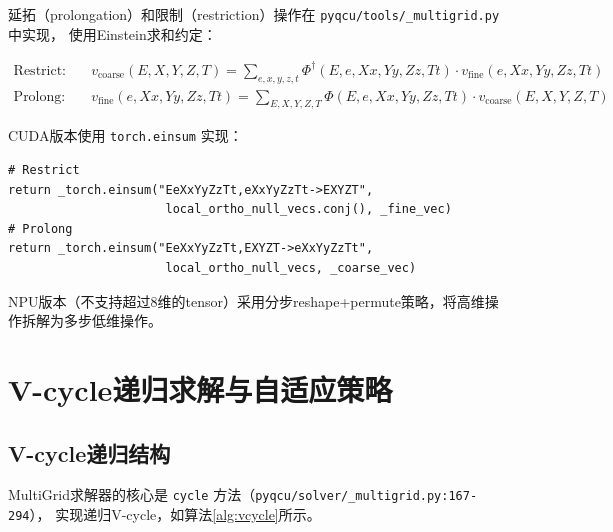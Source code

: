 \documentclass[11pt,a4paper]{article}
\begin{document}
延拓（prolongation）和限制（restriction）操作在 \texttt{pyqcu/tools/\_multigrid.py} 中实现，
使用Einstein求和约定：

\begin{subequations}
\begin{align}
\text{Restrict:}\quad & v_{\text{coarse}}(E,X,Y,Z,T) = \sum_{e,x,y,z,t} \Phi^\dagger(E,e,Xx,Yy,Zz,Tt) \cdot v_{\text{fine}}(e,Xx,Yy,Zz,Tt) \\
\text{Prolong:}\quad & v_{\text{fine}}(e,Xx,Yy,Zz,Tt) = \sum_{E,X,Y,Z,T} \Phi(E,e,Xx,Yy,Zz,Tt) \cdot v_{\text{coarse}}(E,X,Y,Z,T)
\end{align}
\end{subequations}

CUDA版本使用 \texttt{torch.einsum} 实现：
\begin{lstlisting}[style=pythonstyle]
# Restrict
return _torch.einsum("EeXxYyZzTt,eXxYyZzTt->EXYZT",
                      local_ortho_null_vecs.conj(), _fine_vec)
# Prolong
return _torch.einsum("EeXxYyZzTt,EXYZT->eXxYyZzTt",
                      local_ortho_null_vecs, _coarse_vec)
\end{lstlisting}

NPU版本（不支持超过8维的tensor）采用分步reshape+permute策略，将高维操作拆解为多步低维操作。

\section{V-cycle递归求解与自适应策略}

\subsection{V-cycle递归结构}

MultiGrid求解器的核心是 \texttt{cycle} 方法（\texttt{pyqcu/solver/\_multigrid.py:167-294}），
实现递归V-cycle，如算法\ref{alg:vcycle}所示。
\end{document}
